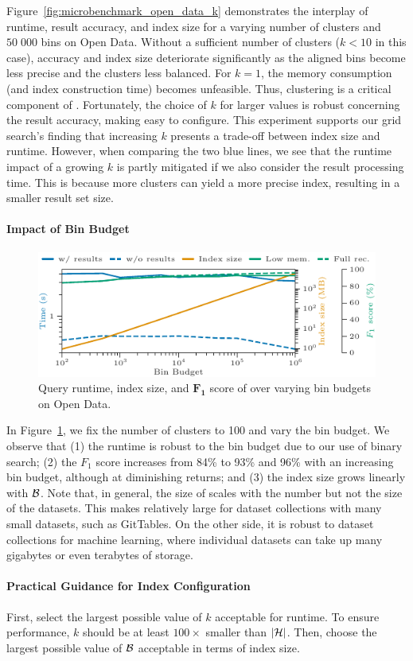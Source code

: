 Figure~\ref{fig:microbenchmark_open_data_k} demonstrates the interplay of runtime, result accuracy, and index size for a varying number of clusters and $50\;000$ bins on Open Data.
Without a sufficient number of clusters ($k<10$ in this case), accuracy and index size deteriorate significantly as the aligned bins become less precise and the clusters less balanced.
For $k=1$, the memory consumption (and index construction time) becomes unfeasible.
Thus, clustering is a critical component of \system{}.
Fortunately, the choice of $k$ for larger values is robust concerning the result accuracy, making \system{} easy to configure.
This experiment supports our grid search's finding that increasing $k$ presents a trade-off between index size and runtime.
However, when comparing the two blue lines, we see that the runtime impact of a growing $k$ is partly mitigated if we also consider the result processing time.
This is because more clusters can yield a more precise index, resulting in a smaller result set size.


\paragraph{Impact of Bin Budget}

\begin{figure}[t]
    \centering
    \includegraphics[scale=0.965]{figures/figure_20.pdf}
    \caption{Query runtime, index size, and $\boldsymbol{F_1}$ score of \approximate{} over varying bin budgets on Open Data.}
    \label{fig:microbenchmark_open_data_b}
\end{figure}

In Figure~\ref{fig:microbenchmark_open_data_b}, we fix the number of clusters to 100 and vary the bin budget.
We observe that (1) the runtime is robust to the bin budget due to our use of binary search; (2) the $F_1$ score increases from 84\% to 93\% and 96\% with an increasing bin budget, although at diminishing returns; and (3) the index size grows linearly with $\mathcal{B}$.
Note that, in general, the size of \system{} scales with the number but not the size of the datasets.
This makes \system{} relatively large for dataset collections with many small datasets, such as GitTables.
On the other side, it is robust to dataset collections for machine learning, where individual datasets can take up many gigabytes or even terabytes of storage.

\paragraph{Practical Guidance for Index Configuration}
First, select the largest possible value of $k$ acceptable for runtime.
To ensure performance, $k$ should be at least $100\times$ smaller than $|\mathcal{H}|$.
Then, choose the largest possible value of $\mathcal{B}$ acceptable in terms of index size.
